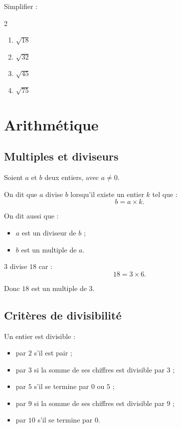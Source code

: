 \documentclass[11pt,a4paper]{article}
\newcounter{exercice}
\begin{document}
\begin{exercice}[Méthode]
Simplifier :
\begin{multicols}{2}
\begin{enumerate}[label=\alph*)]
  \item $\sqrt{18}$
  \item $\sqrt{32}$
  \item $\sqrt{45}$
  \item $\sqrt{75}$
\end{enumerate}
\end{multicols}
\end{exercice}

\newpage

\section{Arithmétique}

\subsection{Multiples et diviseurs}

\begin{definitionbox}
Soient $a$ et $b$ deux entiers, avec $a\neq0$.

On dit que $a$ divise $b$ lorsqu'il existe un entier $k$ tel que :
\[
b=a\times k.
\]

On dit aussi que :
\begin{itemize}
  \item $a$ est un diviseur de $b$ ;
  \item $b$ est un multiple de $a$.
\end{itemize}
\end{definitionbox}

\begin{exemple}
$3$ divise $18$ car :
\[
18=3\times6.
\]

Donc $18$ est un multiple de $3$.
\end{exemple}

\subsection{Critères de divisibilité}

\begin{propriete}
Un entier est divisible :
\begin{itemize}
  \item par $2$ s'il est pair ;
  \item par $3$ si la somme de ses chiffres est divisible par $3$ ;
  \item par $5$ s'il se termine par $0$ ou $5$ ;
  \item par $9$ si la somme de ses chiffres est divisible par $9$ ;
  \item par $10$ s'il se termine par $0$.
\end{itemize}
\end{propriete}
\end{document}
